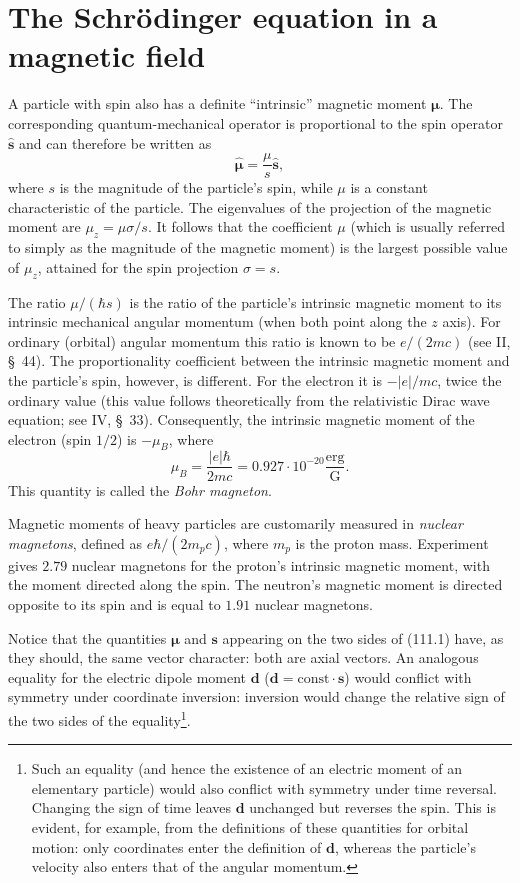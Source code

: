 \section{The Schrödinger equation in a magnetic field}

A particle with spin also has a definite ``intrinsic'' magnetic moment $\boldsymbol\mu$. The corresponding quantum-mechanical operator is proportional to the spin operator $\hat{\mathbf s}$ and can therefore be written as
\begin{equation}
 \hat{\boldsymbol\mu}=\frac{\mu}{s}\hat{\mathbf s},
 \tag{111.1}
\end{equation}
where $s$ is the magnitude of the particle's spin, while $\mu$ is a constant characteristic of the particle. The eigenvalues of the projection of the magnetic moment are $\mu_z=\mu\sigma/s$. It follows that the coefficient $\mu$ (which is usually referred to simply as the magnitude of the magnetic moment) is the largest possible value of $\mu_z$, attained for the spin projection $\sigma=s$.

The ratio $\mu/(\hbar s)$ is the ratio of the particle's intrinsic magnetic moment to its intrinsic mechanical angular momentum (when both point along the $z$ axis). For ordinary (orbital) angular momentum this ratio is known to be $e/(2mc)$ (see II, \S~44). The proportionality coefficient between the intrinsic magnetic moment and the particle's spin, however, is different. For the electron it is $-|e|/mc$, twice the ordinary value (this value follows theoretically from the relativistic Dirac wave equation; see IV, \S~33). Consequently, the intrinsic magnetic moment of the electron (spin $1/2$) is $-\mu_B$, where
\begin{equation}
 \mu_B=\frac{|e|\hbar}{2mc}=0.927\cdot10^{-20}\frac{\text{erg}}{\text{G}}.
 \tag{111.2}
\end{equation}
This quantity is called the \emph{Bohr magneton}.

Magnetic moments of heavy particles are customarily measured in \emph{nuclear magnetons}, defined as $e\hbar/(2m_pc)$, where $m_p$ is the proton mass. Experiment gives $2.79$ nuclear magnetons for the proton's intrinsic magnetic moment, with the moment directed along the spin. The neutron's magnetic moment is directed opposite to its spin and is equal to $1.91$ nuclear magnetons.

Notice that the quantities $\boldsymbol\mu$ and $\mathbf s$ appearing on the two sides of (111.1) have, as they should, the same vector character: both are axial vectors. An analogous equality for the electric dipole moment $\mathbf d$ ($\mathbf d=\mathrm{const}\cdot\mathbf s$) would conflict with symmetry under coordinate inversion: inversion would change the relative sign of the two sides of the equality\footnote{Such an equality (and hence the existence of an electric moment of an elementary particle) would also conflict with symmetry under time reversal. Changing the sign of time leaves $\mathbf d$ unchanged but reverses the spin. This is evident, for example, from the definitions of these quantities for orbital motion: only coordinates enter the definition of $\mathbf d$, whereas the particle's velocity also enters that of the angular momentum.}.

